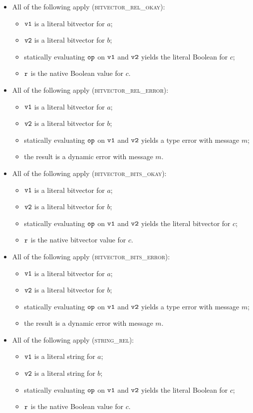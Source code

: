 \begin{itemize}
  \item All of the following apply (\textsc{bitvector\_rel\_okay}):
  \begin{itemize}
    \item $\texttt{v1}$ is a literal bitvector for $a$;
    \item $\texttt{v2}$ is a literal bitvector for $b$;
    \item statically evaluating $\texttt{op}$ on $\texttt{v1}$ and $\texttt{v2}$ yields the literal Boolean for $c$;
    \item $\texttt{r}$ is the native Boolean value for $c$.
  \end{itemize}

  \item All of the following apply (\textsc{bitvector\_rel\_error}):
  \begin{itemize}
    \item $\texttt{v1}$ is a literal bitvector for $a$;
    \item $\texttt{v2}$ is a literal bitvector for $b$;
    \item statically evaluating $\texttt{op}$ on $\texttt{v1}$ and $\texttt{v2}$ yields a type error with message $m$;
    \item the result is a dynamic error with message $m$.
  \end{itemize}

  \item All of the following apply (\textsc{bitvector\_bits\_okay}):
  \begin{itemize}
    \item $\texttt{v1}$ is a literal bitvector for $a$;
    \item $\texttt{v2}$ is a literal bitvector for $b$;
    \item statically evaluating $\texttt{op}$ on $\texttt{v1}$ and $\texttt{v2}$ yields the literal bitvector for $c$;
    \item $\texttt{r}$ is the native bitvector value for $c$.
  \end{itemize}

  \item All of the following apply (\textsc{bitvector\_bits\_error}):
  \begin{itemize}
    \item $\texttt{v1}$ is a literal bitvector for $a$;
    \item $\texttt{v2}$ is a literal bitvector for $b$;
    \item statically evaluating $\texttt{op}$ on $\texttt{v1}$ and $\texttt{v2}$ yields a type error with message $m$;
    \item the result is a dynamic error with message $m$.
  \end{itemize}
  \item All of the following apply (\textsc{string\_rel}):
  \begin{itemize}
    \item $\texttt{v1}$ is a literal string for $a$;
    \item $\texttt{v2}$ is a literal string for $b$;
    \item statically evaluating $\texttt{op}$ on $\texttt{v1}$ and $\texttt{v2}$ yields the literal Boolean for $c$;
    \item $\texttt{r}$ is the native Boolean value for $c$.
  \end{itemize}


\end{itemize}
